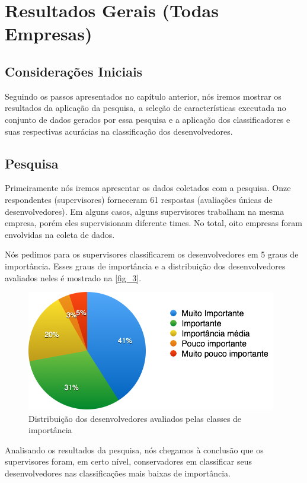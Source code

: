 \chapter[Resultados Gerais]{Resultados Gerais (Todas Empresas)}

\section{Considerações Iniciais}
Seguindo os passos apresentados no capítulo anterior, nós iremos mostrar os resultados da aplicação da pesquisa, a seleção de características executada no conjunto de dados gerados por essa pesquisa e a aplicação dos classificadores e suas respectivas acurácias na classificação dos desenvolvedores.

\section{Pesquisa}\label{secao4.2}
Primeiramente nós iremos apresentar os dados coletados com a pesquisa. Onze respondentes (supervisores) forneceram 61 respostas (avaliações únicas de desenvolvedores). Em alguns casos, alguns supervisores trabalham na mesma empresa, porém eles supervisionam diferente times. No total, oito empresas foram envolvidas na coleta de dados.

Nós pedimos para os supervisores classificarem os desenvolvedores em 5 graus de importância. Esses graus de importância e a distribuição dos desenvolvedores avaliados neles é mostrado na \autoref{fig_3}.

\begin{figure}[p]
	\centering
	\includegraphics[width=\textwidth]{figs/geral/imagem-classe-original.png}
	\caption{\label{fig_3}Distribuição dos desenvolvedores avaliados pelas classes de importância}
\end{figure}

Analisando os resultados da pesquisa, nós chegamos à conclusão que os supervisores foram, em certo nível, conservadores em classificar seus desenvolvedores nas classificações mais baixas de importância.

